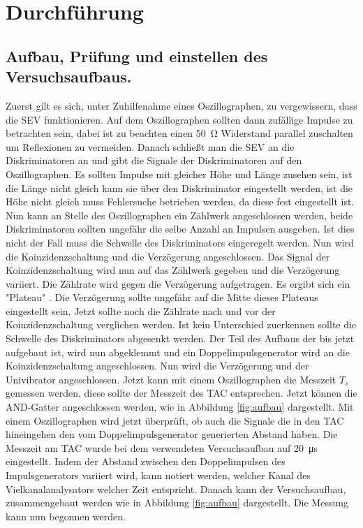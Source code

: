 \section{Durchführung}
\label{sec:Durchführung}
\subsection{Aufbau, Prüfung und einstellen des Versuchsaufbaus.}
Zuerst gilt es sich, unter Zuhilfenahme eines Oszillographen, zu vergewissern, 
dass die SEV funktionieren. 
Auf dem Oszillographen sollten dann zufällige Impulse zu betrachten sein, dabei ist zu beachten 
einen \SI{50}{\ohm} Widerstand parallel zuschalten um Reflexionen zu vermeiden. 
Danach schließt man die SEV an die Diskriminatoren an und gibt die Signale der Diskriminatoren
auf den Oszillographen. Es sollten Impulse mit gleicher Höhe und Länge zusehen sein, ist die Länge 
nicht gleich kann sie über den Diskriminator eingestellt werden, ist die Höhe nicht gleich muss 
Fehlersuche betrieben werden, da diese fest eingestellt ist. 
Nun kann an Stelle des Oszillographen 
ein Zählwerk angeschlossen werden, beide Diskriminatoren sollten ungefähr die selbe Anzahl an 
Impulsen ausgeben. Ist dies nicht der Fall muss die Schwelle des Diskriminators eingeregelt werden. 
Nun wird die Koinzidenzschaltung und die Verzögerung angeschlossen. Das Signal der 
Koinzidenzschaltung wird nun auf das Zählwerk gegeben und die Verzögerung variiert. Die Zählrate 
wird gegen die Verzögerung aufgetragen. Es ergibt sich ein "Plateau" . 
Die Verzögerung sollte ungefähr 
auf die Mitte dieses Plateaus eingestellt sein. Jetzt sollte noch die Zählrate nach und vor 
der Koinzidenzschaltung verglichen werden. Ist kein Unterschied zuerkennen sollte die Schwelle des 
Diskriminators abgesenkt werden. 
\newline
Der Teil des Aufbaus der bis jetzt aufgebaut ist, wird nun abgeklemmt und ein Doppelimpulsgenerator 
wird an die Koinzidenzschaltung angeschlossen. Nun wird die Verzögerung und der Univibrator 
angeschlossen. Jetzt kann mit einem Oszillographen die Messzeit $T_s$ gemessen werden, diese sollte 
der Messzeit des TAC entsprechen. Jetzt können die AND-Gatter angeschlossen 
werden, wie in Abbildung \ref{fig:aufbau} dargestellt. Mit einem Oszillographen wird jetzt 
überprüft, ob auch die Signale die in den TAC hineingehen den vom Doppelimpulsgenerator generierten 
Abstand haben. Die Messzeit am TAC wurde bei dem verwendeten Versuchsaufbau auf \SI{20}{\micro\second} 
eingestellt.
\newline 
Indem der Abstand zwischen den Doppelimpulsen des Impulsgenerators variiert wird, kann notiert 
werden, welcher Kanal des Vielkanalanalysators welcher Zeit entspricht. 
Danach kann der Versuchsaufbau, 
zusammengebaut werden wie in Abbildung \ref{fig:aufbau} dargestellt. Die Messung kann nun 
begonnen werden.   
